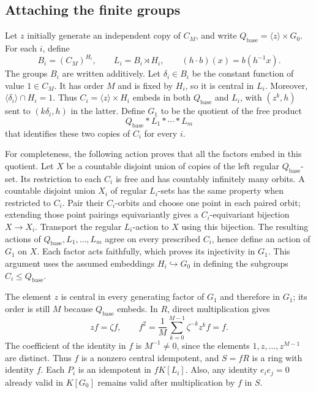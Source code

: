\subsection{Attaching the finite groups}

Let $z$ initially generate an independent copy of $C_M$, and write
$Q_{\mathrm{base}}=\langle z\rangle\times G_0$.  For each $i$, define
\[
 B_i=(C_M)^{H_i},\qquad L_i=B_i\rtimes H_i,
 \qquad (h\cdot b)(x)=b(h^{-1}x).
\]
The groups $B_i$ are written additively.  Let $\delta_i\in B_i$ be the
constant function of value $1\in C_M$.  It has order $M$ and is fixed
by $H_i$, so it is central in $L_i$.  Moreover,
$\langle\delta_i\rangle\cap H_i=1$.  Thus
$C_i=\langle z\rangle\times H_i$ embeds in both $Q_{\mathrm{base}}$ and $L_i$, with
$(z^k,h)$ sent to $(k\delta_i,h)$ in the latter.  Define $G_1$ to be
the quotient of the free product
\[
 Q_{\mathrm{base}}*L_1*\cdots*L_m
\]
that identifies these two copies of $C_i$ for every $i$.

For completeness, the following action proves that all the factors
embed in this quotient.  Let $X$ be a countable disjoint union of copies
of the left regular $Q_{\mathrm{base}}$-set.  Its restriction to each $C_i$ is free and
has countably infinitely many orbits.  A countable disjoint union
$X_i$ of regular $L_i$-sets has the same property when restricted to
$C_i$.  Pair their $C_i$-orbits and choose one point in each paired
orbit; extending those point pairings equivariantly gives a
$C_i$-equivariant bijection $X\to X_i$.  Transport the regular
$L_i$-action to $X$ using this bijection.  The resulting actions of
$Q_{\mathrm{base}},L_1,\ldots,L_m$ agree on every prescribed $C_i$, hence define an
action of $G_1$ on $X$.  Each factor acts faithfully, which proves its
injectivity in $G_1$.  This argument uses the assumed embeddings
$H_i\hookrightarrow G_0$ in defining the subgroups $C_i\le Q_{\mathrm{base}}$.

The element $z$ is central in every generating factor of $G_1$ and
therefore in $G_1$; its order is still $M$ because $Q_{\mathrm{base}}$ embeds.
In $R$, direct multiplication gives
\[
 zf=\zeta f,\qquad
 f^2=\frac1M\sum_{k=0}^{M-1}\zeta^{-k}z^kf=f.
\]
The coefficient of the identity in $f$ is $M^{-1}\ne0$, since the
elements $1,z,\ldots,z^{M-1}$ are distinct.  Thus $f$ is a nonzero
central idempotent, and $S=fR$ is a ring with identity $f$.  Each $P_i$
is an idempotent in $fK[L_i]$.  Also, any identity $e_ie_j=0$ already
valid in $K[G_0]$ remains valid after multiplication by $f$ in $S$.

